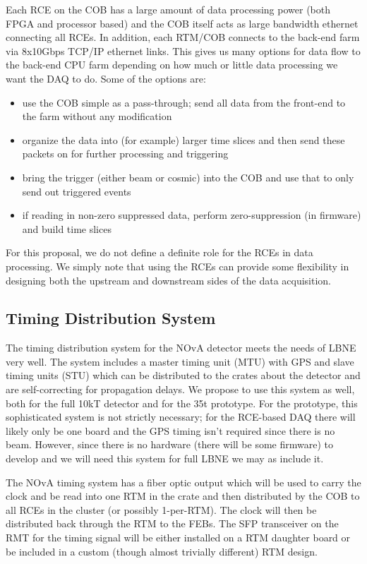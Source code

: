 Each RCE on the COB has a large amount of data processing power (both FPGA and processor based) and the COB itself acts as large bandwidth ethernet connecting all RCEs.  In addition, each RTM/COB connects to the back-end farm via 8x10Gbps TCP/IP ethernet links.  This gives us many options for data flow to the back-end CPU farm depending on how much or little data processing we want the DAQ to do.  Some of the options are:
\begin{itemize}
\item use the COB simple as a pass-through; send all data from the front-end to the farm without any modification
\item organize the data into (for example) larger time slices and then send these packets on for further processing and triggering
\item bring the trigger (either beam or cosmic) into the COB and use that to only send out triggered events
\item if reading in non-zero suppressed data, perform zero-suppression (in firmware) and build time slices
\end{itemize}
For this proposal, we do not define a definite role for the RCEs in data processing.  We simply note that using the RCEs can provide some flexibility in designing both the upstream and downstream sides of the data acquisition.  


\subsection{Timing Distribution System}

The timing distribution system for the NOvA detector\cite{bib:novaTiming} meets the needs of LBNE very well.  The system includes a master timing unit (MTU) with GPS and slave timing units (STU) which can be distributed to the crates about the detector and are self-correcting for propagation delays.  We propose  to use this system as well, both for the full 10kT detector and for the 35t prototype.  For the prototype, this sophisticated system is not strictly necessary; for the RCE-based DAQ there will likely only be one board and the GPS timing isn't required since there is no beam.  However, since there is no hardware (there will be some firmware) to develop and we will need this system for full LBNE we may as include it. 

The NOvA timing system has a fiber optic output which will be used to carry the clock and  be read into one RTM in the crate and then distributed by the COB to all RCEs in the cluster (or possibly 1-per-RTM).  The clock will then be distributed  back through the RTM to the FEBs.   The SFP transceiver on the RMT for the timing signal will be either installed on a RTM daughter board or be included in a custom (though almost trivially different) RTM design.  

